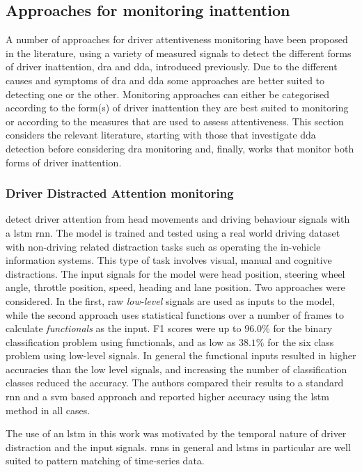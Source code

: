 \documentclass[11pt, parskip=half*,twoside=false]{scrbook}
\begin{document}
\subsection{Approaches for monitoring inattention} \label{ssec:approaches}
A number of approaches for driver attentiveness monitoring have been proposed in the literature, using a variety of measured signals to detect the different forms of driver inattention, \gls{dra} and \gls{dda}, introduced previously. Due to the different causes and symptoms of \gls{dra} and \gls{dda} some approaches are better suited to detecting one or the other. Monitoring approaches can either be categorised according to the form(s) of driver inattention they are best suited to monitoring or according to the measures that are used to assess attentiveness. This section considers the relevant literature, starting with those that investigate \gls{dda} detection before considering \gls{dra} monitoring and, finally, works that monitor both forms of driver inattention. 

\subsubsection{Driver Distracted Attention monitoring}
\citet{wollmerOnlineDriverDistraction2011} detect driver attention from head movements and driving behaviour signals with a \gls{lstm} \gls{rnn}. The model is trained and tested using a real world driving dataset with non-driving related distraction tasks such as operating the in-vehicle information systems. This type of task involves visual, manual and cognitive distractions. The input signals for the model were head position, steering wheel angle, throttle position, speed, heading and lane position. Two approaches were considered. In the first, raw \emph{low-level} signals are used as inputs to the model, while the second approach uses statistical functions over a number of frames to calculate \emph{functionals} as the input. F1 scores were up to $96.0\%$ for the binary classification problem using functionals, and as low as $38.1\%$ for the six class problem using low-level signals. In general the functional inputs resulted in higher accuracies than the low level signals, and increasing the number of classification classes reduced the accuracy. The authors compared their results to a standard \gls{rnn} and a \gls{svm} based approach and reported higher accuracy using the \gls{lstm} method in all cases.

The use of an \gls{lstm} in this work was motivated by the temporal nature of driver distraction and the input signals. \Glspl{rnn} in general and \glspl{lstm} in particular are well suited to pattern matching of time-series data.
\end{document}
